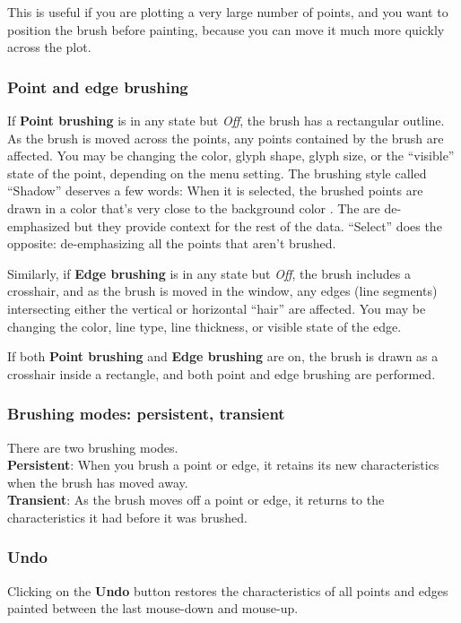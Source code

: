 \documentclass[11pt]{article}
\begin{document}
This is useful if you are plotting a very large number of points,
and you want to position the brush before painting, because you
can move it much more quickly across the plot.  

\subsubsection{Point and edge brushing}
%
If {\bf Point brushing} is in any state but {\it Off}, the brush has a
rectangular outline.  As the brush is moved across the points, any
points contained by the brush are affected.  You may be changing the
color, glyph shape, glyph size, or the ``visible'' state of the point,
depending on the menu setting.  The brushing style called ``Shadow'' 
deserves a few words: When it is selected, the brushed points are drawn
in a color that's very close to the background color \cite{BeckerCleveland87}. 
The
are de-emphasized but they provide context for the rest of the data.
``Select'' does the opposite: de-emphasizing all the points that aren't
brushed.

Similarly, if {\bf Edge brushing} is in any state but {\it Off}, the
brush includes a crosshair, and as the brush is moved in the window,
any edges (line segments) intersecting either the vertical or
horizontal ``hair'' are affected.  You may be changing the color,
line type, line thickness, or visible state of the edge.

If both {\bf Point brushing} and {\bf Edge brushing} are on, the
brush is drawn as a crosshair inside a rectangle, and both point and
edge brushing are performed.

\subsubsection{Brushing modes:  persistent, transient}
%
There are two brushing modes.
\medskip
\noindent
\\{\bf Persistent}:  When you brush a point or edge, it retains its new
  characteristics when the brush has moved away.
\\{\bf Transient}:  As the brush moves off a point or edge, it returns
  to the characteristics it had before it was brushed.

\subsubsection{Undo}
%
Clicking on the {\bf Undo} button restores the characteristics
of all points and edges painted between the last mouse-down and
mouse-up.
\end{document}
